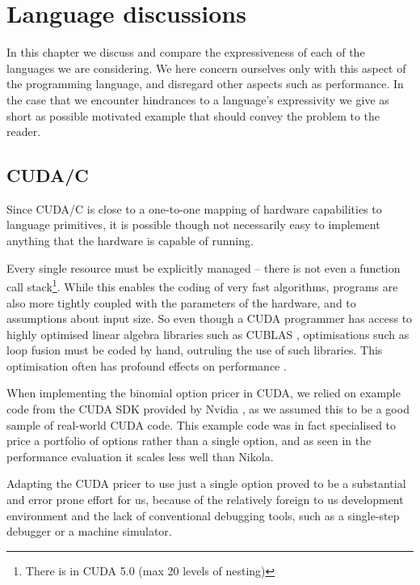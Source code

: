 \chapter{Language discussions}

In this chapter we discuss and compare the expressiveness of each of the
languages we are considering.  We here concern ourselves only with this aspect
of the programming language, and disregard other aspects such as performance.
In the case that we encounter hindrances to a language's expressivity we give
as short as possible motivated example that should convey the problem to the reader.

\section{CUDA/C}
Since CUDA/C is close to a one-to-one mapping of hardware capabilities to language
primitives, it is possible though not necessarily easy to implement anything
that the hardware is capable of running.

Every single resource must be explicitly managed -- there is not even a
function call stack\footnote{There is in CUDA 5.0 (max 20 levels of nesting)}.
While this enables the coding of very fast algorithms, programs are also more
tightly coupled with the parameters of the hardware, and to assumptions about
input size. So even though a CUDA programmer has access to highly optimised
linear algebra libraries such as CUBLAS \cite{CUBLAS2013}, optimisations such
as loop fusion must be coded by hand, outruling the use of such libraries. This
optimisation often has profound effects on performance \cite{mainlandhaskell}.

When implementing the binomial option pricer in CUDA, we relied on example code
from the CUDA SDK provided by Nvidia \cite{CUDAbinomial}, as we assumed this to
be a good sample of real-world CUDA code. This example code was in fact
specialised to price a portfolio of options rather than a single option, and as
seen in the performance evaluation it scales less well than Nikola.

Adapting the CUDA pricer to use just a single option proved to be a substantial
and error prone effort for us, because of the relatively foreign to us
development environment and the lack of conventional debugging tools, such as a
single-step debugger or a machine simulator.

